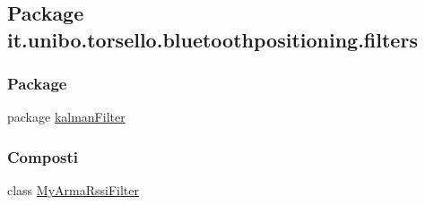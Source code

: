 \hypertarget{namespaceit_1_1unibo_1_1torsello_1_1bluetoothpositioning_1_1filters}{}\subsection{Package it.\+unibo.\+torsello.\+bluetoothpositioning.\+filters}
\label{namespaceit_1_1unibo_1_1torsello_1_1bluetoothpositioning_1_1filters}
\subsubsection*{Package}
\begin{DoxyCompactItemize}
\item 
package \hyperlink{namespaceit_1_1unibo_1_1torsello_1_1bluetoothpositioning_1_1filters_1_1kalmanFilter}{kalman\+Filter}
\end{DoxyCompactItemize}
\subsubsection*{Composti}
\begin{DoxyCompactItemize}
\item 
class \hyperlink{classit_1_1unibo_1_1torsello_1_1bluetoothpositioning_1_1filters_1_1MyArmaRssiFilter}{My\+Arma\+Rssi\+Filter}
\end{DoxyCompactItemize}
